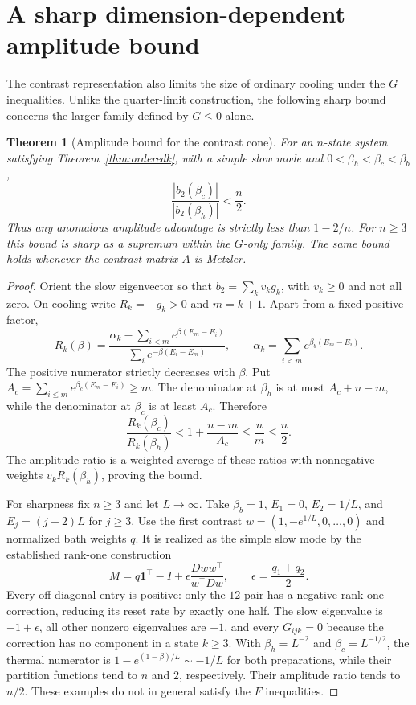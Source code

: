 \documentclass[11pt]{article}
\newtheorem{theorem}{Theorem}
\begin{document}
\section{A sharp dimension-dependent amplitude bound}\label{sec:amplitudebound}
The contrast representation also limits the size of ordinary cooling under
the $G$ inequalities. Unlike the quarter-limit construction, the following
sharp bound concerns the larger family defined by $G\leq0$ alone.

\begin{theorem}[Amplitude bound for the contrast cone]\label{thm:amplitudebound}
For an $n$-state system satisfying Theorem~\ref{thm:orderedk}, with a simple
slow mode and $0<\beta_h<\beta_c<\beta_b$,
\[
\frac{|b_2(\beta_c)|}{|b_2(\beta_h)|}<\frac n2.
\]
Thus any anomalous amplitude advantage is strictly less than $1-2/n$.
For $n\geq3$ this bound is sharp as a supremum within the $G$-only family.
The same bound holds whenever the contrast matrix $A$ is Metzler.
\end{theorem}
\begin{proof}
Orient the slow eigenvector so that $b_2=\sum_k v_kg_k$, with $v_k\geq0$
and not all zero. On cooling write $R_k=-g_k>0$ and $m=k+1$.
Apart from a fixed positive factor,
\[
R_k(\beta)=\frac{\alpha_k-\sum_{i<m}e^{\beta(E_m-E_i)}}
{\sum_i e^{-\beta(E_i-E_m)}},\qquad
\alpha_k=\sum_{i<m}e^{\beta_b(E_m-E_i)}.
\]
The positive numerator strictly decreases with $\beta$. Put
$A_c=\sum_{i\leq m}e^{\beta_c(E_m-E_i)}\geq m$. The denominator at
$\beta_h$ is at most $A_c+n-m$, while the denominator at $\beta_c$ is at
least $A_c$. Therefore
\[
\frac{R_k(\beta_c)}{R_k(\beta_h)}
<1+\frac{n-m}{A_c}\leq\frac nm\leq\frac n2.
\]
The amplitude ratio is a weighted average of these ratios with nonnegative
weights $v_kR_k(\beta_h)$, proving the bound.

For sharpness fix $n\geq3$ and let $L\to\infty$. Take $\beta_b=1$,
$E_1=0$, $E_2=1/L$, and $E_j=(j-2)L$ for $j\geq3$.
Use the first contrast $w=(1,-e^{1/L},0,\ldots,0)$ and normalized bath
weights $q$. It is realized as the simple slow mode by the established
rank-one construction
\[
M=q\mathbf1^\top-I+\epsilon\frac{Dww^\top}{w^\top Dw},
\qquad \epsilon=\frac{q_1+q_2}{2}.
\]
Every off-diagonal entry is positive: only the $12$ pair has a negative
rank-one correction, reducing its reset rate by exactly one half.
The slow eigenvalue is $-1+\epsilon$, all other nonzero eigenvalues are
$-1$, and every $G_{ijk}=0$ because the correction has no component in a
state $k\geq3$. With $\beta_h=L^{-2}$ and $\beta_c=L^{-1/2}$, the thermal
numerator is
$1-e^{(1-\beta)/L}\sim-1/L$ for both preparations, while their partition
functions tend to $n$ and $2$, respectively. Their amplitude ratio tends
to $n/2$. These examples do not in general satisfy the $F$ inequalities.
\end{proof}
\end{document}
